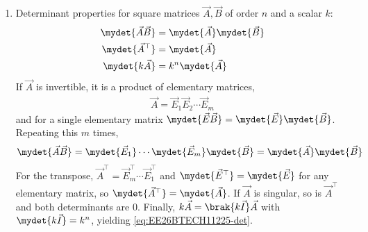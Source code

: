 \begin{enumerate}[label=\thesubsection.\arabic*, ref=\thesubsection.\theenumi]

\item Determinant properties for square matrices $\vec{A}, \vec{B}$ of order $n$ and a scalar $k$:
\begin{align}
	\begin{split}
		\mydet{\vec{A}\vec{B}} &= \mydet{\vec{A}}\mydet{\vec{B}}
		\\
		\mydet{\vec{A}^{\top}} &= \mydet{\vec{A}}
		\\
		\mydet{k\vec{A}} &= k^n\mydet{\vec{A}}
	\end{split}
	\label{eq:EE26BTECH11225-det}
\end{align}
\solution
If $\vec{A}$ is invertible, it is a product of elementary matrices,
\begin{align}
	\vec{A} = \vec{E}_1\vec{E}_2\cdots\vec{E}_m
\end{align}
and for a single elementary matrix $\mydet{\vec{E}\vec{B}} = \mydet{\vec{E}}\mydet{\vec{B}}$. Repeating this $m$ times,
\begin{align}
	\mydet{\vec{A}\vec{B}} = \mydet{\vec{E}_1}\cdots\mydet{\vec{E}_m}\mydet{\vec{B}}
	= \mydet{\vec{A}}\mydet{\vec{B}}
\end{align}
For the transpose, $\vec{A}^{\top} = \vec{E}_m^{\top}\cdots\vec{E}_1^{\top}$ and $\mydet{\vec{E}^{\top}} = \mydet{\vec{E}}$ for any elementary matrix, so
$\mydet{\vec{A}^{\top}} = \mydet{\vec{A}}$. If $\vec{A}$ is singular, so is $\vec{A}^{\top}$ and both determinants are $0$. Finally, $k\vec{A} = \brak{k\vec{I}}\vec{A}$ with $\mydet{k\vec{I}} = k^n$, yielding \eqref{eq:EE26BTECH11225-det}.


\end{enumerate}
